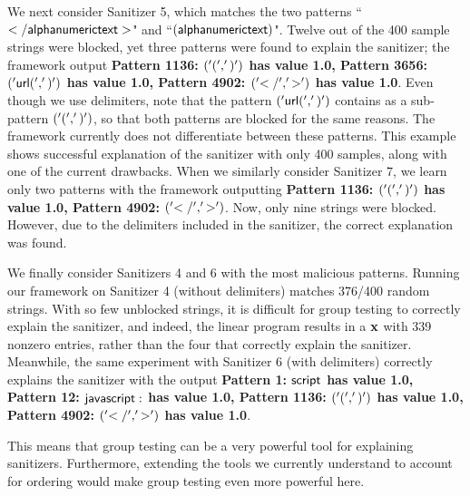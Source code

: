 We next consider Sanitizer 5, which matches the two patterns ``$\sf{</alphanumerictext>}$" and ``$\sf{(alphanumerictext)}$". Twelve out of the 400 sample strings were blocked, yet three patterns were found to explain the sanitizer; the framework output \textbf{Pattern 1136: $\sf{('(', ')')}$ has value 1.0, Pattern 3656: $\sf{('url(', ')')}$ has value 1.0, Pattern 4902: $\sf{('</', '>')}$ has value 1.0}. Even though we use delimiters, note that the pattern $\sf{('url(', ')')}$ contains as a sub-pattern $\sf{('(', ')')}$, so that both patterns are blocked for the same reasons. The framework currently does not differentiate between these patterns. This example shows successful explanation of the sanitizer with only 400 samples, along with one of the current drawbacks. When we similarly consider Sanitizer 7, we learn only two patterns with the framework outputting \textbf{Pattern 1136: $\sf{('(', ')')}$ has value 1.0, Pattern 4902: $\sf{('</', '>')}$}. Now, only nine strings were blocked. However, due to the delimiters included in the sanitizer, the correct explanation was found.
	
We finally consider Sanitizers 4 and 6 with the most malicious patterns. Running our framework on Sanitizer 4 (without delimiters) matches 376/400 random strings.  With so few unblocked strings, it is difficult for group testing to correctly explain the sanitizer, and indeed, the linear program results in a $\mathbf{x}$ with 339 nonzero entries, rather than the four that correctly explain the sanitizer. Meanwhile, the same experiment with Sanitizer 6 (with delimiters) correctly explains the sanitizer with the output \textbf{Pattern 1: $\sf{script}$ has value 1.0, Pattern 12: $\sf{javascript:}$ has value 1.0, Pattern 1136: $\sf{('(', ')')}$ has value 1.0, Pattern 4902: $\sf{('</', '>')}$ has value 1.0}. 

This means that group testing can be a very powerful tool for explaining sanitizers. Furthermore, extending the tools we currently understand to account for ordering would make group testing even more powerful here.